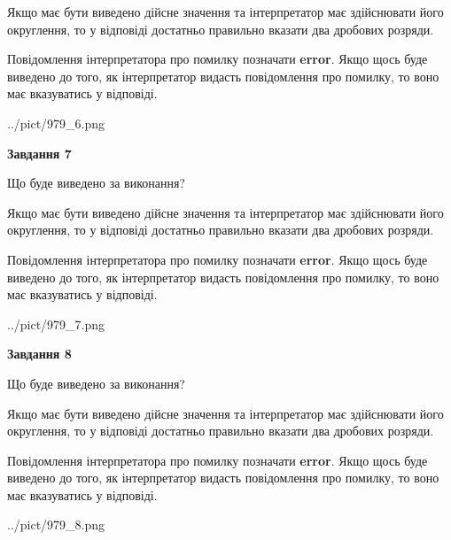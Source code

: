 \documentclass[12pt, ukrainian]{article}
\begin{document}
{\begin {Large}
Якщо має бути виведено дійсне значення та інтерпретатор має здійснювати його округлення, 
то у відповіді достатньо правильно вказати два дробових розряди.

Повідомлення інтерпретатора про помилку позначати \textbf{error}.
Якщо щось буде виведено до того, як інтерпретатор видасть повідомлення про помилку, 
то воно має вказуватись у відповіді. \par

\begin{center}
	{../pict/979_6.png}
\end{center}
\newpage

{\begin {center}\textbf{Завдання 7}\end {center}}\par
Що буде виведено за виконання? \par

Якщо має бути виведено дійсне значення та інтерпретатор має здійснювати його округлення, 
то у відповіді достатньо правильно вказати два дробових розряди.

Повідомлення інтерпретатора про помилку позначати \textbf{error}.
Якщо щось буде виведено до того, як інтерпретатор видасть повідомлення про помилку, 
то воно має вказуватись у відповіді. \par

\begin{center}
	{../pict/979_7.png}
\end{center}
\newpage

{\begin {center}\textbf{Завдання 8}\end {center}}\par
Що буде виведено за виконання? \par

Якщо має бути виведено дійсне значення та інтерпретатор має здійснювати його округлення, 
то у відповіді достатньо правильно вказати два дробових розряди.

Повідомлення інтерпретатора про помилку позначати \textbf{error}.
Якщо щось буде виведено до того, як інтерпретатор видасть повідомлення про помилку, 
то воно має вказуватись у відповіді. \par

\begin{center}
	{../pict/979_8.png}
\end{center}
\newpage


\end{Large}}
\end{document}
